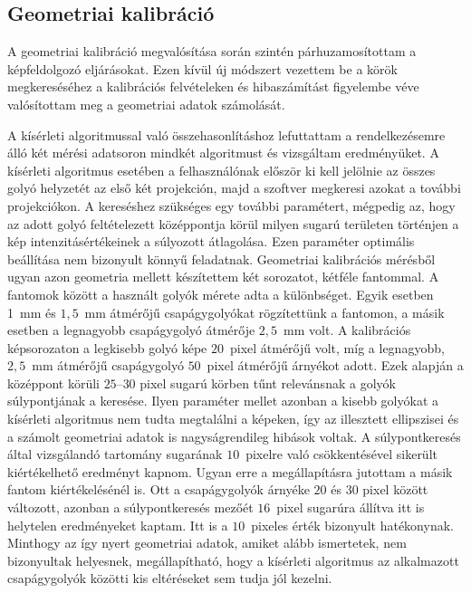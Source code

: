 \documentclass[a4paper,12pt]{article}
\begin{document}
\subsection{Geometriai kalibráció}

A geometriai kalibráció megvalósítása során szintén párhuzamosítottam a képfeldolgozó eljárásokat. Ezen kívül új módszert vezettem be a körök megkereséséhez a kalibrációs felvételeken és hibaszámítást figyelembe véve valósítottam meg a geometriai adatok számolását.

A kísérleti algoritmussal való összehasonlításhoz lefuttattam a rendelkezésemre álló két mérési adatsoron mindkét algoritmust és vizsgáltam eredményüket. A kísérleti algoritmus esetében a felhasználónak először ki kell jelölnie az összes golyó helyzetét az első két projekción, majd a szoftver megkeresi azokat a további projekciókon. A kereséshez szükséges egy további paramétert, mégpedig az, hogy az adott golyó feltételezett középpontja körül milyen sugarú területen történjen a kép intenzitásértékeinek a súlyozott átlagolása. Ezen paraméter optimális beállítása nem bizonyult könnyű feladatnak. Geometriai kalibrációs mérésből ugyan azon geometria mellett készítettem két sorozatot, kétféle fantommal. A fantomok között a használt golyók mérete adta a különbséget. Egyik esetben 1~mm és $1,\!5$~mm átmérőjű csapágygolyókat rögzítettünk a fantomon, a másik esetben a legnagyobb csapágygolyó átmérője $2,\!5$~mm volt. A kalibrációs képsorozaton a legkisebb golyó képe $20$~pixel átmérőjű volt, míg a legnagyobb, $2,\!5$~mm átmérőjű csapágygolyó $50$~pixel átmérőjű árnyékot adott. Ezek alapján a középpont körüli $25$--$30$ pixel sugarú körben tűnt relevánsnak a golyók súlypontjának a keresése. Ilyen paraméter mellet azonban a kisebb golyókat a kísérleti algoritmus nem tudta megtalálni a képeken, így az illesztett ellipszisei és a számolt geometriai adatok is nagyságrendileg hibások voltak. A súlypontkeresés által vizsgálandó tartomány sugarának $10$~pixelre való csökkentésével sikerült kiértékelhető eredményt kapnom. Ugyan erre a megállapításra jutottam a másik fantom kiértékelésénél is. Ott a csapágygolyók árnyéke $20$ és $30$ pixel között változott, azonban a súlypontkeresés mezőét $16$~pixel sugarúra állítva itt is helytelen eredményeket kaptam. Itt is a $10$~pixeles érték bizonyult hatékonynak. Minthogy az így nyert geometriai adatok, amiket alább ismertetek, nem bizonyultak helyesnek, megállapítható, hogy a kísérleti algoritmus az alkalmazott csapágygolyók közötti kis eltéréseket sem tudja jól kezelni.
\end{document}
